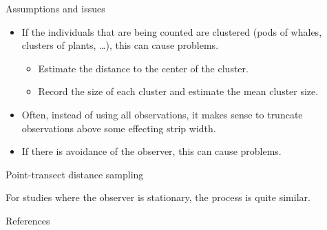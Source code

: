 \documentclass[
  ignorenonframetext,
]{beamer}
\providecommand{\tightlist}{%
  \setlength{\itemsep}{0pt}\setlength{\parskip}{0pt}}
\begin{document}
\begin{frame}{Assumptions and issues}
\protect\hypertarget{assumptions-and-issues}{}

\begin{itemize}
\item
  If the individuals that are being counted are clustered (pods of
  whales, clusters of plants, \ldots), this can cause problems.

  \begin{itemize}
  \tightlist
  \item
    Estimate the distance to the center of the cluster.
  \item
    Record the size of each cluster and estimate the mean cluster size.
  \end{itemize}
\item
  Often, instead of using all observations, it makes sense to truncate
  observations above some effecting strip width.
\item
  If there is avoidance of the observer, this can cause problems.
\end{itemize}

\end{frame}

\begin{frame}{Point-transect distance sampling}
\protect\hypertarget{point-transect-distance-sampling}{}

For studies where the observer is stationary, the process is quite
similar.

\end{frame}

\begin{frame}{References}
\protect\hypertarget{references}{}

\end{frame}
\end{document}
